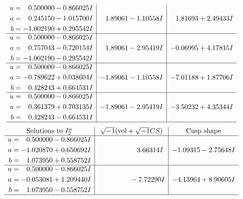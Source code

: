\documentclass[1p]{elsarticle_modified}
\theoremstyle{definition}
\newcommand{\I}{\sqrt{-1}}
\begin{document}
$$\begin{array}{c|c|c}
\begin{aligned}
u &= \phantom{-}0.500000 - 0.866025 I \\
a &= \phantom{-}0.245150 - 1.015700 I \\
b &= -1.002190 + 0.295542 I\end{aligned}
 & \phantom{-}1.89061 - 1.10558 I & \phantom{-}1.81693 + 2.49433 I \\ \hline\begin{aligned}
u &= \phantom{-}0.500000 - 0.866025 I \\
a &= \phantom{-}0.757043 - 0.720154 I \\
b &= -1.002190 - 0.295542 I\end{aligned}
 & \phantom{-}1.89061 - 2.95419 I & -0.06995 + 4.17815 I \\ \hline\begin{aligned}
u &= \phantom{-}0.500000 - 0.866025 I \\
a &= -0.789622 + 0.038604 I \\
b &= \phantom{-}0.428243 + 0.664531 I\end{aligned}
 & -1.89061 - 1.10558 I & -7.01188 + 1.87706 I \\ \hline\begin{aligned}
u &= \phantom{-}0.500000 - 0.866025 I \\
a &= \phantom{-}0.361379 + 0.703135 I \\
b &= \phantom{-}0.428243 - 0.664531 I\end{aligned}
 & -1.89061 - 2.95419 I & -3.50232 + 4.35344 I\\
 \hline 
 \end{array}$$\newpage$$\begin{array}{c|c|c}  
\text{Solutions to }I^u_{2}& \I (\text{vol} + \sqrt{-1}CS) & \text{Cusp shape}\\
 \hline 
\begin{aligned}
u &= \phantom{-}0.500000 - 0.866025 I \\
a &= -1.020870 + 0.650692 I \\
b &= \phantom{-}1.073950 + 0.558752 I\end{aligned}
 & \phantom{-0.000000 -}3.66314 I & -1.09315 - 2.75648 I \\ \hline\begin{aligned}
u &= \phantom{-}0.500000 - 0.866025 I \\
a &= -0.053081 + 1.209440 I \\
b &= \phantom{-}1.073950 - 0.558752 I\end{aligned}
 & \phantom{-0.000000 } -7.72290 I & -4.13964 + 8.90605 I\\
 \hline 
 \end{array}$$\newpage
\end{document}
